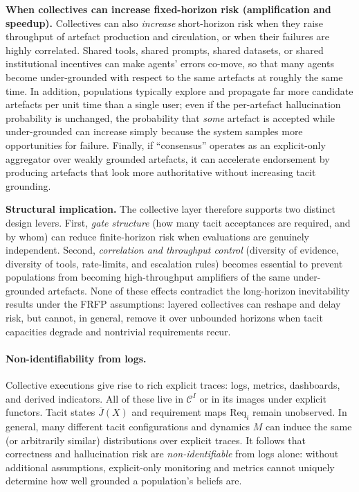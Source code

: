 \smallskip
\noindent
\textbf{When collectives can increase fixed-horizon risk (amplification and speedup).}
Collectives can also \emph{increase} short-horizon risk when they raise throughput of artefact production and
circulation, or when their failures are highly correlated. Shared tools, shared prompts, shared datasets, or
shared institutional incentives can make agents' errors co-move, so that many agents become under-grounded
with respect to the same artefacts at roughly the same time. In addition, populations typically explore and
propagate far more candidate artefacts per unit time than a single user; even if the per-artefact
hallucination probability is unchanged, the probability that \emph{some} artefact is accepted while
under-grounded can increase simply because the system samples more opportunities for failure. Finally, if
``consensus'' operates as an explicit-only aggregator over weakly grounded artefacts, it can accelerate
endorsement by producing artefacts that look more authoritative without increasing tacit grounding.

\smallskip
\noindent
\textbf{Structural implication.}
The collective layer therefore supports two distinct design levers. First, \emph{gate structure} (how many
tacit acceptances are required, and by whom) can reduce finite-horizon risk when evaluations are genuinely
independent. Second, \emph{correlation and throughput control} (diversity of evidence, diversity of tools,
rate-limits, and escalation rules) becomes essential to prevent populations from becoming
high-throughput amplifiers of the same under-grounded artefacts. None of these effects contradict the
long-horizon inevitability results under the FRFP assumptions: layered collectives can reshape and delay
risk, but cannot, in general, remove it over unbounded horizons when tacit capacities degrade and nontrivial
requirements recur.
\paragraph{Non-identifiability from logs.}
Collective executions give rise to rich explicit traces: logs, metrics, dashboards, and derived indicators. All of these live in $\mathcal{C}^I$ or in its images under explicit functors. Tacit states $\overline{J}(X)$ and requirement maps $\mathrm{Req}_i$ remain unobserved. In general, many different tacit configurations and dynamics $M$ can induce the same (or arbitrarily similar) distributions over explicit traces. It follows that correctness and hallucination risk are \emph{non-identifiable} from logs alone: without additional assumptions, explicit-only monitoring and metrics cannot uniquely determine how well grounded a population's beliefs are.

